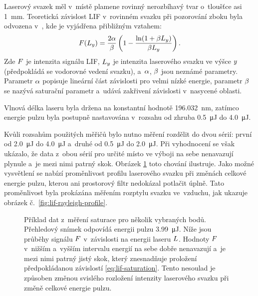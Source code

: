 Laserový svazek měl v~místě plamene rovinný nerozbíhavý tvar
o~tloušťce asi \SI{1}{\milli\metre}.
Teoretická závislost LIF v~rovinném svazku při pozorování zboku
byla odvozena v~\cite{lif-pb}, kde je vyjádřena přibližným vztahem:
\begin{equation}
	\label{eq:lif-saturation}
	F(L_y) = \frac{2\alpha}{\beta}
	\left( 1 - \frac{\ln(1 + \beta L_y)}{\beta L_y} \right).
\end{equation}
Zde $F$ je intenzita signálu LIF,
$L_y$ je intenzita laserového svazku ve výšce $y$
(předpokládá se vodorovné vedení svazku),
a~$\alpha$, $\beta$ jsou neznámé parametry.
Parametr $\alpha$ popisuje lineární část závislosti pro velmi nízké energie,
parametr $\beta$ se nazývá saturační parametr a~udává zakřivení
závislosti v~nasycené oblasti.

Vlnová délka laseru byla držena na konstantní
hodnotě \SI{196.032}{\nano\metre},
zatímco energie pulzu byla postupně nastavována v~rozsahu
od zhruba \SI{0.5}{\micro\joule} do \SI{4.0}{\micro\joule}.

Kvůli rozsahům použitých měřičů bylo nutno měření rozdělit do dvou sérií:
první od \SI{2.0}{\micro\joule} do \SI{4.0}{\micro\joule}
a~druhé od \SI{0.5}{\micro\joule} do \SI{2.0}{\micro\joule}.
Při vyhodnocení se však ukázalo, že data z~obou sérií pro určité místo
ve výboji na sebe nenavazují plynule a~je mezi nimi patrný skok.
Obrázek \ref{fig:lif-saturation-full-example} toto chování ilustruje.
Jako možné vysvětlení se nabízí proměnlivost profilu laserového svazku
při změnách celkové energie pulzu, kterou ani prostorový filtr
nedokázal potlačit úplně.
Tato proměnlivost byla prokázána měřením rozptylu svazku ve~vzduchu,
jak ukazuje obrázek č.~\ref{fig:lif-rayleigh-profile}.

\begin{figure}
	\centering
	
	
	
	\caption{Příklad dat z~měření saturace pro několik vybraných bodů.
		Přehledový snímek odpovídá energii pulzu \SI{3.99}{\micro\joule}.
		Níže jsou průběhy signálu $F$ v~závislosti na energii
		laseru $L$.
		Hodnoty $F$ v~nižším a~vyšším intervalu energií na sebe
		dobře nenavazují a~je mezi nimi patrný jistý skok,
		který znesnadňuje proložení předpokládanou
		závislostí \eqref{eq:lif-saturation}.
		Tento nesoulad je způsoben změnou svislého rozložení intenzity
		laserového svazku při změně celkové energie pulzu.}
	\label{fig:lif-saturation-full-example}
\end{figure}

